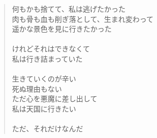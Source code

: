 \documentclass[../IHMain]{subfiles}
\begin{document}
\begin{verse}
        \newpage

        何もかも捨てて、私は逃げたかった\\
        肉も骨も血も削ぎ落として、生まれ変わって\\
        遥かな景色を見に行きたかった\\　\\

        けれどそれはできなくて\\
        私は行き詰まっていた\\　\\

        生きていくのが辛い\\
        死ぬ理由もない\\
        ただ心を悪魔に差し出して\\
        私は天国に行きたい\\　\\
        ただ、それだけなんだ
    \end{verse}
        \newpage
\end{document}
